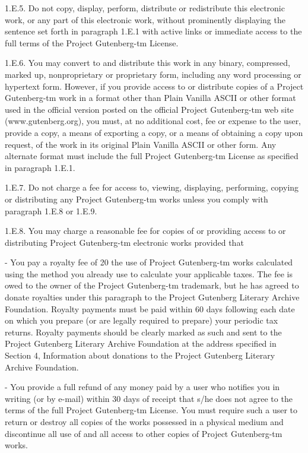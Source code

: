 \documentclass{article}
\begin{document}
1.E.5.  Do not copy, display, perform, distribute or redistribute this
electronic work, or any part of this electronic work, without
prominently displaying the sentence set forth in paragraph 1.E.1 with
active links or immediate access to the full terms of the Project
Gutenberg-tm License.

1.E.6.  You may convert to and distribute this work in any binary,
compressed, marked up, nonproprietary or proprietary form, including any
word processing or hypertext form.  However, if you provide access to or
distribute copies of a Project Gutenberg-tm work in a format other than
Plain Vanilla ASCII or other format used in the official version
posted on the official Project Gutenberg-tm web site (www.gutenberg.org),
you must, at no additional cost, fee or expense to the user, provide a
copy, a means of exporting a copy, or a means of obtaining a copy upon
request, of the work in its original Plain Vanilla ASCII or other
form.  Any alternate format must include the full Project Gutenberg-tm
License as specified in paragraph 1.E.1.

1.E.7.  Do not charge a fee for access to, viewing, displaying,
performing, copying or distributing any Project Gutenberg-tm works
unless you comply with paragraph 1.E.8 or 1.E.9.

1.E.8.  You may charge a reasonable fee for copies of or providing
access to or distributing Project Gutenberg-tm electronic works provided
that

- You pay a royalty fee of 20%
     the use of Project Gutenberg-tm works calculated using the method
     you already use to calculate your applicable taxes.  The fee is
     owed to the owner of the Project Gutenberg-tm trademark, but he
     has agreed to donate royalties under this paragraph to the
     Project Gutenberg Literary Archive Foundation.  Royalty payments
     must be paid within 60 days following each date on which you
     prepare (or are legally required to prepare) your periodic tax
     returns.  Royalty payments should be clearly marked as such and
     sent to the Project Gutenberg Literary Archive Foundation at the
     address specified in Section 4, Information about donations to
     the Project Gutenberg Literary Archive Foundation.

- You provide a full refund of any money paid by a user who notifies
     you in writing (or by e-mail) within 30 days of receipt that s/he
     does not agree to the terms of the full Project Gutenberg-tm
     License.  You must require such a user to return or
     destroy all copies of the works possessed in a physical medium
     and discontinue all use of and all access to other copies of
     Project Gutenberg-tm works.
\end{document}
